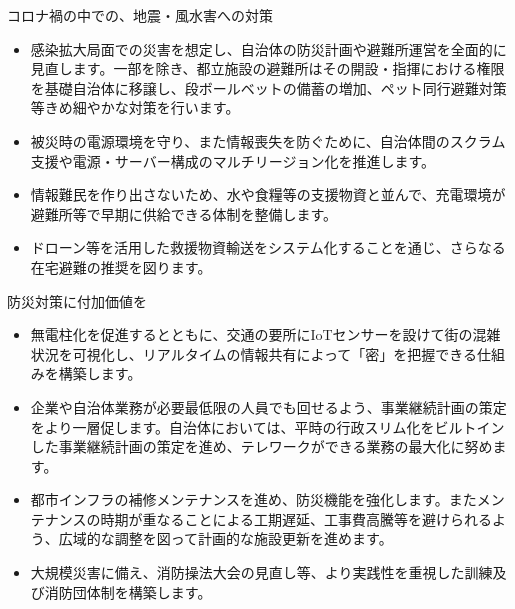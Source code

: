 \documentclass[dvipdfmx]{beamer}
\begin{document}
    \begin{frame}{コロナ禍の中での、地震・風水害への対策}{}
        \begin{small}
            \begin{itemize}
                \setlength{\itemsep}{2mm}
                \item 感染拡大局面での災害を想定し、自治体の防災計画や避難所運営を全面的に見直します。一部を除き、都立施設の避難所はその開設・指揮における権限を基礎自治体に移譲し、段ボールベットの備蓄の増加、ペット同行避難対策等きめ細やかな対策を行います。
                \item 被災時の電源環境を守り、また情報喪失を防ぐために、自治体間のスクラム支援や電源・サーバー構成のマルチリージョン化を推進します。
                \item 情報難民を作り出さないため、水や食糧等の支援物資と並んで、充電環境が避難所等で早期に供給できる体制を整備します。
                \item ドローン等を活用した救援物資輸送をシステム化することを通じ、さらなる在宅避難の推奨を図ります。
            \end{itemize}
        \end{small}
    \end{frame}

    \begin{frame}{防災対策に付加価値を}{}
        \begin{small}
            \begin{itemize}
                \setlength{\itemsep}{2mm}
                \item 無電柱化を促進するとともに、交通の要所にIoTセンサーを設けて街の混雑状況を可視化し、リアルタイムの情報共有によって「密」を把握できる仕組みを構築します。
                \item 企業や自治体業務が必要最低限の人員でも回せるよう、事業継続計画の策定をより一層促します。自治体においては、平時の行政スリム化をビルトインした事業継続計画の策定を進め、テレワークができる業務の最大化に努めます。
                \item 都市インフラの補修メンテナンスを進め、防災機能を強化します。またメンテナンスの時期が重なることによる工期遅延、工事費高騰等を避けられるよう、広域的な調整を図って計画的な施設更新を進めます。
                \item 大規模災害に備え、消防操法大会の見直し等、より実践性を重視した訓練及び消防団体制を構築します。
            \end{itemize}
        \end{small}
    \end{frame}
\end{document}
